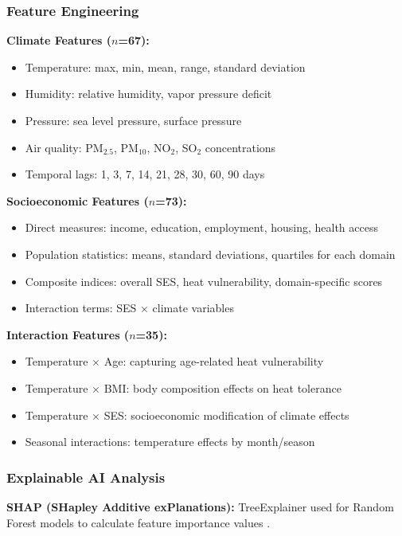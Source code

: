 \documentclass[11pt,a4paper]{article}
\begin{document}
\subsubsection{Feature Engineering}

\textbf{Climate Features ($n$=67):}
\begin{itemize}
\item Temperature: max, min, mean, range, standard deviation
\item Humidity: relative humidity, vapor pressure deficit
\item Pressure: sea level pressure, surface pressure
\item Air quality: PM$_{2.5}$, PM$_{10}$, NO$_2$, SO$_2$ concentrations
\item Temporal lags: 1, 3, 7, 14, 21, 28, 30, 60, 90 days
\end{itemize}

\textbf{Socioeconomic Features ($n$=73):}
\begin{itemize}
\item Direct measures: income, education, employment, housing, health access
\item Population statistics: means, standard deviations, quartiles for each domain
\item Composite indices: overall SES, heat vulnerability, domain-specific scores
\item Interaction terms: SES $\times$ climate variables
\end{itemize}

\textbf{Interaction Features ($n$=35):}
\begin{itemize}
\item Temperature $\times$ Age: capturing age-related heat vulnerability
\item Temperature $\times$ BMI: body composition effects on heat tolerance  
\item Temperature $\times$ SES: socioeconomic modification of climate effects
\item Seasonal interactions: temperature effects by month/season
\end{itemize}

\subsubsection{Explainable AI Analysis}

\textbf{SHAP (SHapley Additive exPlanations):} TreeExplainer used for Random Forest models to calculate feature importance values \cite{lundberg2017unified}.
\end{document}
